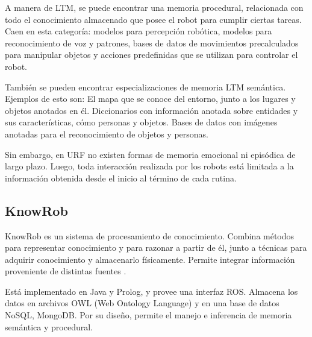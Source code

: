 A manera de LTM, se puede encontrar una memoria procedural, relacionada con todo el conocimiento almacenado que posee el robot para cumplir ciertas tareas. Caen en esta categoría: modelos para percepción robótica, modelos para reconocimiento de voz y patrones, bases de datos de movimientos precalculados para manipular objetos y acciones predefinidas que se utilizan para controlar el robot.

También se pueden encontrar especializaciones de memoria LTM semántica. Ejemplos de esto son: El mapa que se conoce del entorno, junto a los lugares y objetos anotados en él. Diccionarios con información anotada sobre entidades y sus características, cómo personas y objetos. Bases de datos con imágenes anotadas para el reconocimiento de objetos y personas. 

Sin embargo, en URF no existen formas de memoria emocional ni episódica de largo plazo. Luego, toda interacción realizada por los robots está limitada a la información obtenida desde el inicio al término de cada rutina.



\subsection{KnowRob}

KnowRob es un sistema de procesamiento de conocimiento. Combina métodos para representar conocimiento y para razonar a partir de él, junto a técnicas  para adquirir conocimiento y almacenarlo físicamente. Permite integrar información proveniente de distintas fuentes \cite{Tenorth2013, Tenorth2009}.

Está implementado en Java y Prolog, y provee una interfaz ROS. Almacena los datos en archivos OWL (Web Ontology Language) y en una base de datos NoSQL, MongoDB. Por su diseño, permite el manejo e inferencia de memoria semántica y procedural.









